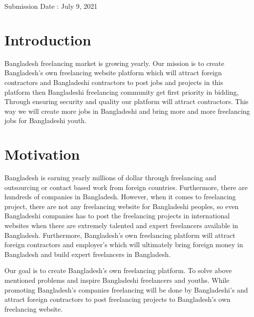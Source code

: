 \documentclass{article}
\begin{document}
\begin{center}
    \begin{Large}
        Submission Date : July 9, 2021
    \end{Large}
\end{center}
\pagebreak 



\section{Introduction}
Bangladesh freelancing market is growing yearly. Our mission is to create Bangladesh's own freelancing website platform which will attract foreign contractors and Bangladeshi contractors to post jobs and projects in this platform then Bangladeshi freelancing community get first priority in bidding, Through ensuring security and quality our platform will attract contractors. This way we will create more jobs in Bangladeshi and bring more and more freelancing jobs for Bangladeshi youth.

\section{Motivation}
Bangladesh is earning yearly millions of dollar through freelancing and outsourcing or contact based work from foreign countries. Furthermore, there are hundreds of companies in Bangladesh. However, when it comes to freelancing project, there are not any freelancing website for Bangladeshi peoples, so even Bangladeshi companies has to post the freelancing projects in international websites when there are extremely talented and expert freelancers available in Bangladesh. Furthermore, Bangladesh's own freelancing platform will attract foreign contractors and employer's which will ultimately bring foreign money in Bangladesh and build expert freelancers in Bangladesh.  

Our goal is to create Bangladesh's own freelancing platform. To solve above mentioned problems and inspire Bangladeshi freelancers and youths. While promoting Bangladesh's companies freelancing will be done by Bangladeshi's and attract foreign contractors to post freelancing projects to Bangladesh's own freelancing website.
\end{document}
